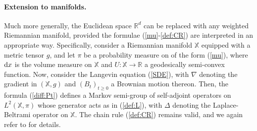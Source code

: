 \documentclass[12pt,final]{article}
\numberwithin{equation}{section}
\newcommand{\dR}{\mathbb {R}}
\newcommand{\dX}{\mathbb{X}}
\begin{document}
\paragraph{Extension to manifolds.}
Much more generally, the  Euclidean space $\dR^d$  can be replaced with any weighted Riemannian manifold, provided  the formulae (\ref{mu}-\ref{def:CR}) are interpreted in an appropriate way. Specifically, consider a Riemannian manifold $\dX$ equipped with a metric tensor $g$, and let $\pi$ be a probability measure on of the form (\ref{mu}), where ${\rm d} x$ is the volume measure on $\dX$ and $U\colon \dX\to\dR$ a geodesically semi-convex function. Now, consider the Langevin equation (\ref{SDE}), with $\nabla$ denoting the gradient in  $(\dX,g)$ and $(B_t)_{t\ge 0}$ a Brownian motion thereon.  Then, the formula (\ref{diff:Pt})  defines a Markov semi-group of self-adjoint operators on $L^2(\dX,\pi)$ whose generator  acts as in (\ref{def:L}), with $\Delta$  denoting the Laplace-Beltrami operator on $\dX$. The chain rule (\ref{def:CR}) remains valid, and we again refer to \cite{MR889476,MR3155209} for details. 

\iffalse
\end{document}
